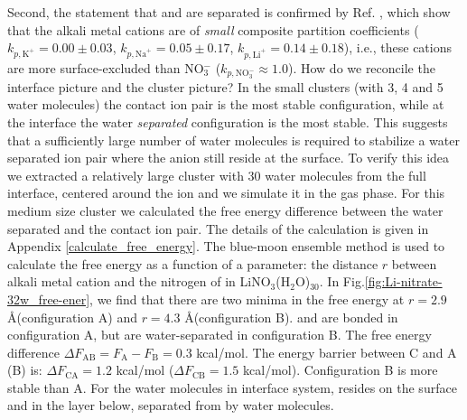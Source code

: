 Second, the statement that \Li and \nitrate are separated is confirmed by Ref. \cite{Pegram06,Pegram08},
which show that the alkali metal cations are of \emph{small}
composite partition coefficients ($k_{p,\text{K}^+} = 0.00\pm 0.03$, $k_{p,\text{Na}^+} = 0.05\pm 0.17$, $k_{p,\text{Li}^+} = 0.14\pm 0.18$), i.e., 
these cations are more surface-excluded than 
NO$_3^-$ ($k_{p,\text{NO}_3^-} \approx 1.0$).
How do we reconcile the interface picture and the cluster picture?
In the small clusters (with 3, 4 and 5 water molecules) the contact ion pair is the most stable configuration, 
while at the interface the water \emph{separated} configuration is the most stable.
This suggests that a sufficiently large number of water molecules is required to stabilize a water separated ion pair where
the \nitrate anion still reside at the surface. 
To verify this idea we extracted a relatively large cluster with 30 water molecules from the full interface, centered
around the \Li ion and we simulate it in the gas phase. 
For this medium size cluster we calculated the free energy difference between the
water separated and the contact ion pair. The details of the calculation is given in Appendix \ref{calculate_free_energy}. 
The blue-moon ensemble method \cite{CCHK89,Sprik98,Tuckerman10} is used to calculate the free energy as a function of a parameter: 
the distance $r$ between alkali metal cation and the nitrogen of \nitrate in LiNO$_3$(H$_2$O)$_{30}$.
In Fig.\thinspace\ref{fig:Li-nitrate-32w_free-ener}, we find that there are two minima in the free energy
at $r=2.9$ \AA (configuration A)  and $r=4.3$ \AA(configuration B).
\Li and \nitrate are bonded in configuration A, but are water-separated in configuration B.
The free energy difference $\Delta{F}_{\text{AB}}=F_{\text{A}}-F_{\text{B}} = 0.3$ kcal/mol. 
The energy barrier between C and A (B) is:
$\Delta{F_{\text{CA}}} = 1.2$ kcal/mol ($\Delta F_{\text{CB}} = 1.5$ kcal/mol). Configuration B is more stable than A.
For the water molecules in interface system, \nitrate resides on the surface and \Li in the layer below, separated from \nitrate by water molecules.

